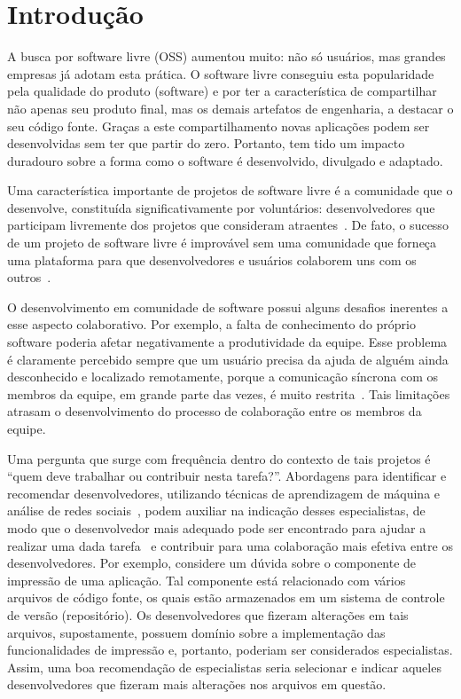 \documentclass[oneside,brazil,a4paper]{normas-utf-tex}
\begin{document}
\chapter{Introdução}
\label{cap:intro}
  
A busca por software livre (OSS) aumentou muito: não só usuários, mas grandes empresas já adotam esta prática. O software livre conseguiu esta popularidade pela qualidade do produto (software) e por ter a característica de compartilhar não apenas seu produto final, mas os demais artefatos de engenharia, a destacar o seu código fonte. Graças a este compartilhamento novas aplicações podem ser desenvolvidas sem ter que partir do zero. Portanto, tem tido um impacto duradouro sobre a forma como o software é desenvolvido, divulgado e adaptado.

Uma característica importante de projetos de software livre é a comunidade que o desenvolve, constituída significativamente por voluntários: desenvolvedores que participam livremente dos projetos que consideram atraentes~\cite{Madey-etal:2002}. De fato, o sucesso de um projeto de software livre é improvável sem uma comunidade que forneça uma plataforma para que desenvolvedores e usuários colaborem uns com os outros~\cite{YeKishida-etal:2003}. 

O desenvolvimento em comunidade de software possui alguns desafios inerentes a esse aspecto colaborativo. Por exemplo, a falta de conhecimento do próprio software poderia afetar negativamente a produtividade da equipe. Esse problema é claramente percebido sempre que um usuário precisa da ajuda de alguém ainda desconhecido e localizado remotamente, porque a comunicação síncrona com os membros da equipe, em grande parte das vezes, é muito restrita~\cite{Moraes-etal:2010}. Tais limitações atrasam o desenvolvimento do processo de colaboração entre os membros da equipe. 

Uma pergunta que surge com frequência dentro do contexto de tais projetos é ``quem deve trabalhar ou contribuir nesta tarefa?''. Abordagens para identificar e recomendar desenvolvedores, utilizando técnicas de aprendizagem de máquina e análise de redes sociais~\cite{Naguib-etal:2013}, podem auxiliar na indicação desses especialistas, de modo que o desenvolvedor mais adequado pode ser encontrado para ajudar a realizar uma dada tarefa~\cite{Robbes-etal:2013} e contribuir para uma colaboração mais efetiva entre os desenvolvedores. Por exemplo, considere um dúvida sobre o componente de impressão de uma aplicação. Tal componente está relacionado com vários arquivos de código fonte, os quais estão armazenados em um sistema de controle de versão (repositório). Os desenvolvedores que fizeram alterações em tais arquivos, supostamente, possuem domínio sobre a implementação das funcionalidades de impressão e, portanto, poderiam ser considerados especialistas. Assim, uma boa recomendação de especialistas seria selecionar e indicar aqueles desenvolvedores que fizeram mais alterações nos arquivos em questão.
\end{document}
